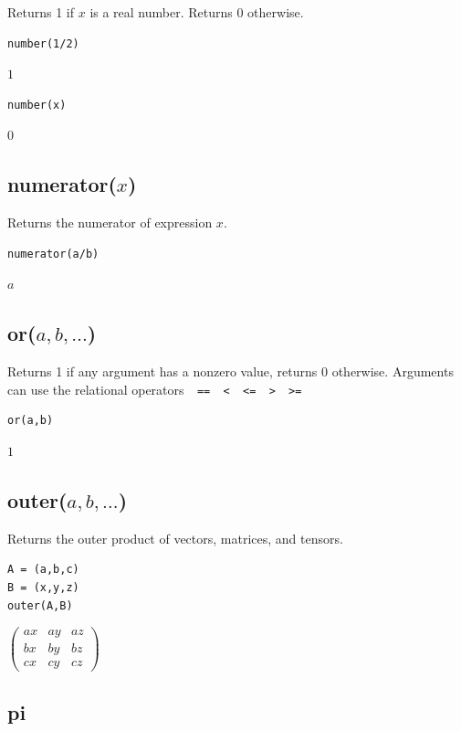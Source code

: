 Returns 1 if $x$ is a real number.
Returns 0 otherwise.

{\color{blue}
\begin{verbatim}
number(1/2)
\end{verbatim}
}

$1$

{\color{blue}
\begin{verbatim}
number(x)
\end{verbatim}
}

$0$

\subsection*{numerator($x$)}

Returns the numerator of expression $x$.

{\color{blue}
\begin{verbatim}
numerator(a/b)
\end{verbatim}
}

$a$

\subsection*{or($a,b,\ldots$)}

Returns 1 if any argument has a nonzero value, returns 0 otherwise.
Arguments can use the relational operators\verb$  ==  <  <=  >  >=$

{\color{blue}
\begin{verbatim}
or(a,b)
\end{verbatim}
}

$1$

\subsection*{outer($a,b,\ldots$)}

Returns the outer product of vectors, matrices, and tensors.

{\color{blue}
\begin{verbatim}
A = (a,b,c)
B = (x,y,z)
outer(A,B)
\end{verbatim}
}

$\displaystyle
\begin{pmatrix}
a x & a y & a z
\\[1ex]
b x & b y & b z
\\[1ex]
c x & c y & c z
\end{pmatrix}
$

\subsection*{pi}

